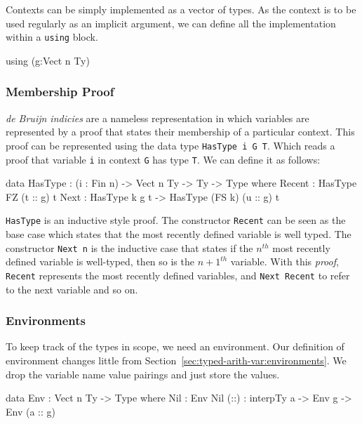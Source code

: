 Contexts can be simply implemented as a vector of types.
As the context is to be used regularly as an implicit argument, we can define all the implementation within a \texttt{using} block.

\begin{code}
using (g:Vect n Ty)
\end{code}

\subsubsection{Membership Proof}
\label{sec:lambda:typing:membership-proof}

\emph{de Bruijn indicies} are a nameless representation in which variables are represented by a proof that states their membership of a particular context.
This proof can be represented using the data type \texttt{HasType i G T}.
Which reads a proof that variable \texttt{i} in context \texttt{G} has type \texttt{T}.
We can define it as follows:

\begin{code}
data HasType : (i : Fin n) -> Vect n Ty -> Ty -> Type where
    Recent : HasType FZ (t :: g) t
    Next   : HasType k g t -> HasType (FS k) (u :: g) t
\end{code}

\noindent
\texttt{HasType} is an inductive style proof.
The constructor \texttt{Recent} can be seen as the base case which states that the most recently defined variable is well typed.
The constructor \texttt{Next n} is the inductive case that states if the $n^{th}$ most recently defined variable is well-typed, then so is the $n+1^{th}$ variable.
With this \emph{proof}, \texttt{Recent} represents the most recently defined variables, and \texttt{Next Recent} to refer to the next variable and so on.

\subsubsection{Environments}
\label{sec:lambda:typying:envs}

To keep track of the types in scope, we need an environment.
Our definition of environment changes little from Section~\ref{sec:typed-arith-var:environments}.
We drop the variable name value pairings and just store the values.

\begin{code}
data Env : Vect n Ty -> Type where
    Nil  : Env Nil
    (::) : interpTy a -> Env g -> Env (a :: g)
\end{code}

